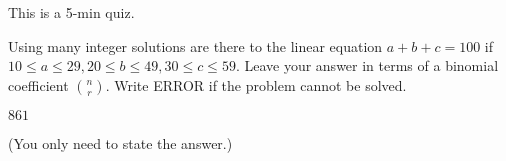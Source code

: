 

\renewcommand\AUTHOR{nweadick1@cougars.ccis.edu} %


\topmattertwo

This is a 5-min quiz.

\nextq
Using many integer solutions are there to the linear equation
$a + b + c = 100$ if $10 \leq a \leq 29, 20 \leq b \leq 49, 30 \leq c \leq 59$.
Leave your answer in terms of a binomial coefficient $\binom{n}{r}$.
Write ERROR if the problem cannot be solved.
\\
\ANSWER
\begin{answerlong}
$861$
\end{answerlong}
(You only need to state the answer.)

\newpage


